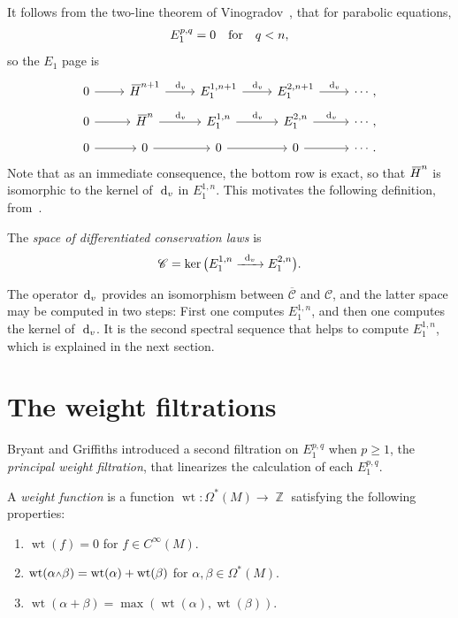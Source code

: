 \documentclass[10pt,a4paper]{amsart}
\DeclareMathOperator{\Z}{\mathbb{Z}}
\renewcommand{\d}{{\rm d}}
\newcommand{\w}{{\mathchoice{\,{\scriptstyle\wedge}\,}{{\scriptstyle\wedge}}
 {{\scriptscriptstyle\wedge}}{{\scriptscriptstyle\wedge}}}}
\DeclareMathOperator{\wt}{\mathrm{wt}}
\newcommand{\dv}{\ensuremath{\hspace{1pt} \d_v}}
\newcommand{\barh}[1]{{}\mkern3mu\overline{\mkern-3mu H}^{#1}}
\newcommand{\cMinfty}{C^\infty(M)}
\numberwithin{equation}{section}
\begin{document}
It follows from the two-line theorem of Vinogradov~\cite{Vinogradov}, that for parabolic equations,
\begin{gather*}
E^{p,q}_1 = 0 \text{\quad for\quad } q < n ,
\end{gather*}
so the $E_1$ page is
\begin{equation*}
 {\begin{tikzcd}
 0 \ar[r] & {\barh{n+1}} \ar[r, "\dv"] & {E^{1,n+1}_1} \ar[r, "\dv"] & {E^{2,n+1}_1} \ar[r, "\dv"] & \cdots ,
 \\[-3ex]
 0 \ar[r] & {\barh{n}} \ar[r, "\dv"] & {E^{1,n}_1} \ar[r, "\dv"] & {E^{2,n}_1} \ar[r, "\dv"] & \cdots ,
 \\[-3ex]
 0 \ar[r] & 0 \ar[r] & 0 \ar[r] & 0 \ar[r] & \cdots.
 \end{tikzcd}}
\end{equation*}
Note that as an immediate consequence, the bottom row is exact, so that $\barh{n}$ is isomorphic to the kernel of~$\dv$ in $E^{1,n}_1$. This motivates the following definition, from~\cite{Characteristic_Cohomology_I}.
\begin{Definition}
 The \emph{space of differentiated conservation laws} is
 \begin{gather*}
 \mathscr{C} = \ker\big(E^{1,n}_1 \xrightarrow{\ \dv\ } E^{2,n}_1\big) .
 \end{gather*}
\end{Definition}
The operator $\dv$ provides an isomorphism between $\overline{\mathscr{C}}$ and $\mathscr{C}$, and the latter space may be computed in two steps: First one computes $E^{1,n}_1$, and then one computes the kernel of~$\dv$. It is the second spectral sequence that helps to compute $E_1^{1,n}$, which is explained in the next section.

\section{The weight filtrations}\label{sec:weight filtrations}

Bryant and Griffiths introduced a second filtration on $E_1^{p,q}$ when $p\ge 1$, the \emph{principal weight filtration}, that linearizes the calculation of each $E^{p,q}_1$.

\begin{Definition}
 A \emph{weight function} is a function $\wt\colon \Omega^*(M) \to \Z$ satisfying the following properties:
 \begin{enumerate}\itemsep=0pt
 \item $\wt(f) = 0$ for $f \in \cMinfty$.
 \item $\wt(\alpha\w\beta) = \wt(\alpha) + \wt(\beta)$ for $\alpha,\beta \in \Omega^*(M)$.
 \item $\wt(\alpha + \beta) = \max(\wt(\alpha),\wt(\beta))$.
 \end{enumerate}
\end{Definition}
\end{document}
